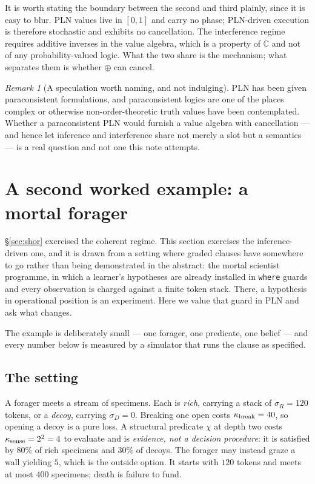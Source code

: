 \documentclass[11pt,a4paper]{article}
\theoremstyle{plain}
\theoremstyle{definition}
\theoremstyle{remark}
\newtheorem{remark}[theorem]{Remark}
\newcommand{\Cx}{\mathbb{C}}
\newcommand{\sumv}{\oplus}
\begin{document}
It is worth stating the boundary between the second and third plainly, since it
is easy to blur. PLN values live in $[0,1]$ and carry no phase; PLN-driven
execution is therefore stochastic and exhibits no cancellation. The interference
regime requires additive inverses in the value algebra, which is a property of
$\Cx$ and not of any probability-valued logic. What the two share is the
mechanism; what separates them is whether $\sumv$ can cancel.

\begin{remark}[A speculation worth naming, and not indulging]\label{rem:paraconsistent}
PLN has been given paraconsistent formulations, and paraconsistent logics are
one of the places complex or otherwise non-order-theoretic truth values have
been contemplated. Whether a paraconsistent PLN would furnish a value algebra
with cancellation --- and hence let inference and interference share not merely a
slot but a semantics --- is a real question and not one this note attempts.
\end{remark}

\section{A second worked example: a mortal forager}\label{sec:forager}

\S\ref{sec:shor} exercised the coherent regime. This section exercises the
inference-driven one, and it is drawn from a setting where graded clauses have
somewhere to go rather than being demonstrated in the abstract: the mortal
scientist programme, in which a learner's hypotheses are already installed in
\texttt{where} guards and every observation is charged against a finite token
stack. There, a hypothesis in operational position is an experiment. Here we
value that guard in PLN and ask what changes.

The example is deliberately small --- one forager, one predicate, one belief ---
and every number below is measured by a simulator that runs the clause as
specified.

\subsection{The setting}

A forager meets a stream of specimens. Each is \emph{rich}, carrying a stack of
$\sigma_R = 120$ tokens, or a \emph{decoy}, carrying $\sigma_D = 0$. Breaking one
open costs $\kappa_{\rm break} = 40$, so opening a decoy is a pure loss. A
structural predicate $\chi$ at depth two costs $\kappa_{\rm sense} = 2^2 = 4$ to
evaluate and is \emph{evidence, not a decision procedure}: it is satisfied by
$80\%$ of rich specimens and $30\%$ of decoys. The forager may instead graze a
wall yielding $5$, which is the outside option. It starts with $120$ tokens and
meets at most $400$ specimens; death is failure to fund.
\end{document}
